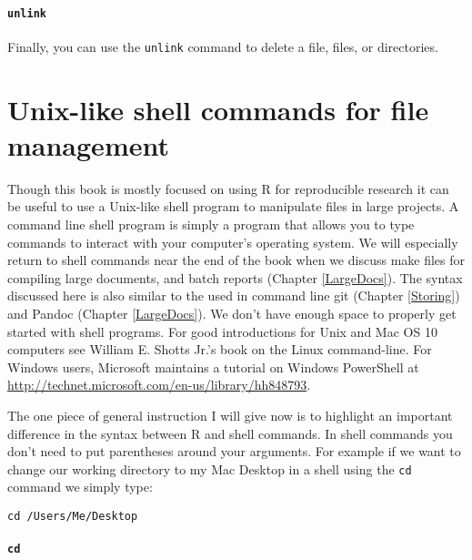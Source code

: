 {\paragraph{{\tt{unlink}}}

Finally, you can use the {\tt{unlink}} command to delete a file, files, or directories. 

\section{Unix-like shell commands for file management} 

Though this book is mostly focused on using R for reproducible research it can be useful to use a Unix-like shell program to manipulate files in large projects. A command line shell program is simply a program that allows you to type commands to interact with your computer's operating system. We will especially return to shell commands near the end of the book when we discuss make files for compiling large documents, and batch reports (Chapter \ref{LargeDocs}). The syntax discussed here is also similar to the used in command line git (Chapter \ref{Storing}) and Pandoc (Chapter \ref{LargeDocs}). We don't have enough space to properly get started with shell programs. For good introductions for Unix and Mac OS 10 computers see William E. Shotts Jr.'s book on the Linux command-line\cite[]{ShottsJr2012}. For Windows users, Microsoft maintains a tutorial on Windows PowerShell at \url{http://technet.microsoft.com/en-us/library/hh848793}.

The one piece of general instruction I will give now is to highlight an important difference in the syntax between R and shell commands. In shell commands you don't need to put parentheses around your arguments. For example if we want to change our working directory to my Mac Desktop in a shell using the {\tt{cd}} command we simply type:

\begin{knitrout}
\color{fgcolor}\begin{kframe}
\begin{verbatim}
cd /Users/Me/Desktop
\end{verbatim}
\end{kframe}
\end{knitrout}



\paragraph{{\tt{cd}}}

}
